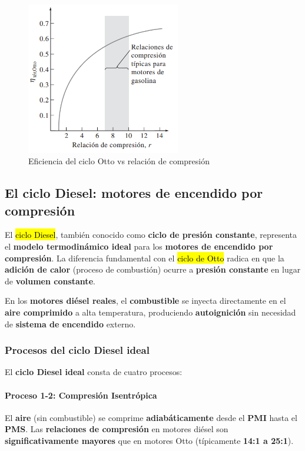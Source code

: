 \documentclass{article}
\begin{document}
    \begin{figure}[H]
        \centering
        \includegraphics[width=0.6\textwidth]{Pasted_image_20250803100148.png}
        \caption{Eficiencia del ciclo Otto vs relación de compresión}
        \label{fig:eficiencia_otto}
    \end{figure}

    \subsection{El ciclo Diesel: motores de encendido por compresión}

    El \hl{ciclo Diesel}, también conocido como \textbf{ciclo de presión constante}, representa el \textbf{modelo termodinámico ideal} para los \textbf{motores de encendido por compresión}. La diferencia fundamental con el \hl{ciclo de Otto} radica en que la \textbf{adición de calor} (proceso de combustión) ocurre a \textbf{presión constante} en lugar de \textbf{volumen constante}.

    En los \textbf{motores diésel reales}, el \textbf{combustible} se inyecta directamente en el \textbf{aire comprimido} a alta temperatura, produciendo \textbf{autoignición} sin necesidad de \textbf{sistema de encendido} externo.

    \subsubsection{Procesos del ciclo Diesel ideal}

    El \textbf{ciclo Diesel ideal} consta de cuatro procesos:

    \paragraph{Proceso 1-2: Compresión Isentrópica}
    El \textbf{aire} (sin combustible) se comprime \textbf{adiabáticamente} desde el \textbf{PMI} hasta el \textbf{PMS}. Las \textbf{relaciones de compresión} en motores diésel son \textbf{significativamente mayores} que en motores Otto (típicamente \textbf{14:1 a 25:1}).
\end{document}
